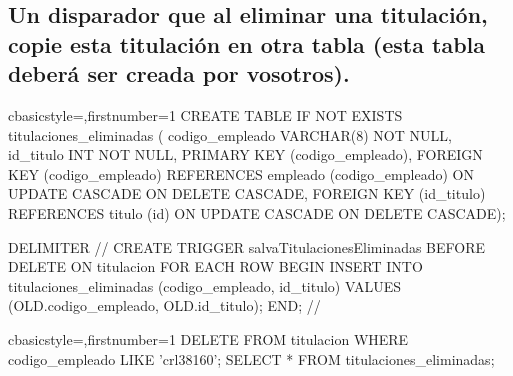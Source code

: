 	\subsection{Un disparador que al eliminar una titulación, copie esta titulación en otra tabla (esta tabla deberá ser creada por vosotros).}
		\begin{sourcecodep}[]{c}{basicstyle={\fontsize{10}{10}\selectfont\ttfamily},firstnumber=1}{}
			CREATE TABLE IF NOT EXISTS titulaciones_eliminadas (
				codigo_empleado VARCHAR(8) NOT NULL,
				id_titulo INT NOT NULL,
				PRIMARY KEY (codigo_empleado),
				FOREIGN KEY (codigo_empleado) REFERENCES empleado (codigo_empleado) ON UPDATE CASCADE ON DELETE CASCADE,
				FOREIGN KEY (id_titulo) REFERENCES titulo (id) ON UPDATE CASCADE ON DELETE CASCADE);
			
			DELIMITER //
			CREATE TRIGGER salvaTitulacionesEliminadas BEFORE DELETE ON titulacion FOR EACH ROW
			BEGIN
				INSERT INTO titulaciones_eliminadas (codigo_empleado, id_titulo) VALUES (OLD.codigo_empleado, OLD.id_titulo);
			END;
			//\end{sourcecodep}
		\begin{sourcecodep}[]{c}{basicstyle={\fontsize{10}{10}\selectfont\ttfamily},firstnumber=1}{}
			DELETE FROM titulacion WHERE codigo_empleado LIKE 'crl38160';
			SELECT * FROM titulaciones_eliminadas;\end{sourcecodep}
